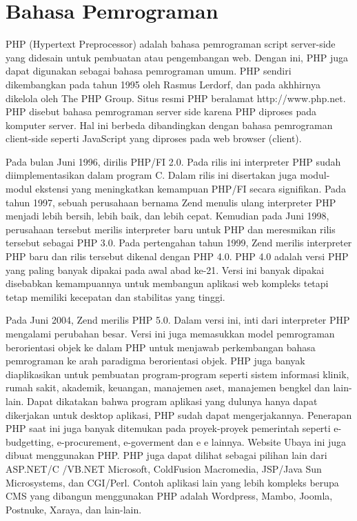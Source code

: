 \section{Bahasa Pemrograman}
PHP (Hypertext Preprocessor) adalah bahasa pemrograman script server-side yang didesain untuk pembuatan atau pengembangan web. Dengan ini, PHP juga dapat digunakan sebagai bahasa pemrograman umum. PHP sendiri dikembangkan pada tahun 1995
oleh Rasmus Lerdorf, dan pada akhhirnya dikelola oleh The PHP Group. Situs resmi PHP beralamat http://www.php.net.
PHP disebut bahasa pemrograman server side karena PHP diproses pada komputer server.  Hal ini berbeda dibandingkan dengan bahasa pemrograman client-side seperti JavaScript yang diproses pada web browser (client).
\par
Pada bulan Juni 1996, dirilis PHP/FI 2.0. Pada rilis ini interpreter PHP sudah diimplementasikan dalam program C. Dalam rilis ini disertakan juga modul-modul ekstensi yang meningkatkan kemampuan PHP/FI secara signifikan. Pada tahun 1997, sebuah perusahaan bernama Zend menulis ulang interpreter PHP menjadi lebih bersih, lebih baik, dan lebih cepat. Kemudian pada Juni 1998, perusahaan tersebut merilis interpreter baru untuk PHP dan meresmikan rilis tersebut sebagai PHP 3.0.
Pada pertengahan tahun 1999, Zend merilis interpreter PHP baru dan rilis tersebut dikenal dengan PHP 4.0. PHP 4.0 adalah versi PHP yang paling banyak dipakai pada awal abad ke-21. Versi ini banyak dipakai disebabkan kemampuannya untuk membangun aplikasi web kompleks tetapi tetap memiliki kecepatan dan stabilitas yang tinggi.
\par
Pada Juni 2004, Zend merilis PHP 5.0. Dalam versi ini, inti dari interpreter PHP mengalami perubahan besar. Versi ini juga memasukkan model pemrograman berorientasi objek ke dalam PHP untuk menjawab perkembangan bahasa pemrograman ke arah paradigma berorientasi objek. PHP juga banyak diaplikasikan untuk pembuatan program-program seperti sistem informasi  klinik, rumah sakit, akademik, keuangan, manajemen aset, manajemen bengkel dan lain-lain. Dapat dikatakan bahwa program aplikasi yang dulunya hanya dapat dikerjakan untuk desktop aplikasi, PHP sudah dapat mengerjakannya. Penerapan PHP saat ini juga banyak ditemukan pada proyek-proyek pemerintah seperti e-budgetting, e-procurement, e-goverment dan e e lainnya. Website Ubaya ini juga dibuat menggunakan PHP. PHP juga dapat dilihat sebagai pilihan lain dari ASP.NET/C /VB.NET Microsoft, ColdFusion Macromedia, JSP/Java Sun Microsystems, dan CGI/Perl. Contoh aplikasi lain yang lebih kompleks berupa CMS yang dibangun menggunakan PHP adalah Wordpress, Mambo, Joomla, Postnuke, Xaraya, dan lain-lain.

